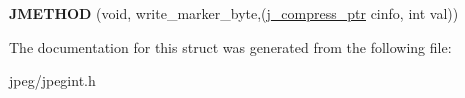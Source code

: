 \begin{DoxyCompactItemize}
\item 
{\bfseries J\+M\+E\+T\+H\+OD} (void, write\+\_\+marker\+\_\+byte,(\hyperlink{structjpeg__compress__struct}{j\+\_\+compress\+\_\+ptr} cinfo, int val))\hypertarget{structjpeg__marker__writer_a193395c80dab66a95681aff53cd5c468}{}\label{structjpeg__marker__writer_a193395c80dab66a95681aff53cd5c468}

\end{DoxyCompactItemize}


The documentation for this struct was generated from the following file\+:\begin{DoxyCompactItemize}
\item 
jpeg/jpegint.\+h\end{DoxyCompactItemize}
